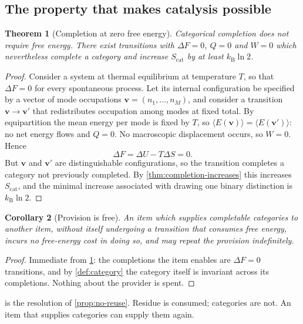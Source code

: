 \documentclass[11pt,twocolumn,a4paper]{article}
\theoremstyle{plain}
\newtheorem{theorem}{Theorem}[section]
\newtheorem{corollary}[theorem]{Corollary}
\theoremstyle{definition}
\theoremstyle{remark}
\newcommand{\kB}{k_{\mathrm{B}}}
\newcommand{\Scat}{S_{\mathrm{cat}}}
\begin{document}
\subsection{The property that makes catalysis possible}

\begin{theorem}[Completion at zero free energy]
\label{thm:zero-free-energy}
Categorical completion does not require free energy. There exist transitions
with $\Delta F = 0$, $Q = 0$ and $W = 0$ which nevertheless complete a category
and increase $\Scat$ by at least $\kB \ln 2$.
\end{theorem}

\begin{proof}
Consider a system at thermal equilibrium at temperature $T$, so that
$\Delta F = 0$ for every spontaneous process. Let its internal configuration be
specified by a vector of mode occupations $\mathbf{v} = (n_1,\dots,n_M)$, and
consider a transition $\mathbf{v} \to \mathbf{v}'$ that redistributes occupation
among modes at fixed total. By equipartition the mean energy per mode is fixed
by $T$, so $\langle E(\mathbf{v})\rangle = \langle E(\mathbf{v}')\rangle$: no
net energy flows and $Q=0$. No macroscopic displacement occurs, so $W=0$. Hence
\begin{equation}
\Delta F = \Delta U - T\Delta S = 0 .
\end{equation}
But $\mathbf{v}$ and $\mathbf{v}'$ are distinguishable configurations, so the
transition completes a category not previously completed. By
\cref{thm:completion-increases} this increases $\Scat$, and the minimal increase
associated with drawing one binary distinction is $\kB\ln 2$.
\end{proof}

\begin{corollary}[Provision is free]
\label{cor:provision-free}
An item which supplies completable categories to another item, without itself
undergoing a transition that consumes free energy, incurs no free-energy cost in
doing so, and may repeat the provision indefinitely.
\end{corollary}

\begin{proof}
Immediate from \cref{thm:zero-free-energy}: the completions the item enables are
$\Delta F = 0$ transitions, and by \cref{def:category} the category itself is
invariant across its completions. Nothing about the provider is spent.
\end{proof}

 is the resolution of \cref{prop:no-reuse}. Residue is
consumed; categories are not. An item that supplies categories can supply them
again.
\end{document}
